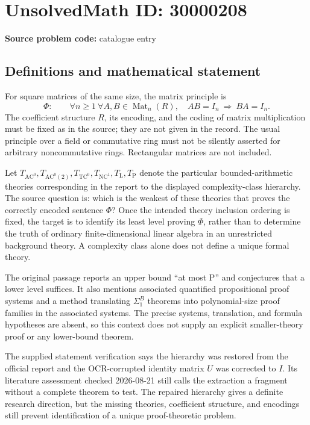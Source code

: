 \documentclass[11pt]{article}
\begin{document}
\section*{UnsolvedMath ID: 30000208}
\textbf{Source problem code:} catalogue entry
\subsection{Definitions and mathematical statement}
For square matrices of the same size, the matrix principle is
\[
\Phi:\qquad\forall n\geq1\ \forall A,B\in\operatorname{Mat}_n(R),\quad
AB=I_n\ \Longrightarrow\ BA=I_n.
\]
The coefficient structure \(R\), its encoding, and the coding of matrix multiplication must be fixed as in the source; they are not given in the record. The usual principle over a field or commutative ring must not be silently asserted for arbitrary noncommutative rings. Rectangular matrices are not included.

Let \(T_{\mathrm{AC}^0},T_{\mathrm{AC}^0(2)},T_{\mathrm{TC}^0},T_{\mathrm{NC}^1},T_{\mathrm L},T_{\mathrm P}\) denote the particular bounded-arithmetic theories corresponding in the report to the displayed complexity-class hierarchy. The source question is: which is the weakest of these theories that proves the correctly encoded sentence \(\Phi\)? Once the intended theory inclusion ordering is fixed, the target is to identify its least level proving \(\Phi\), rather than to determine the truth of ordinary finite-dimensional linear algebra in an unrestricted background theory. A complexity class alone does not define a unique formal theory.

The original passage reports an upper bound ``at most \(\mathrm P\)'' and conjectures that a lower level suffices. It also mentions associated quantified propositional proof systems and a method translating \(\Sigma^B_1\) theorems into polynomial-size proof families in the associated systems. The precise systems, translation, and formula hypotheses are absent, so this context does not supply an explicit smaller-theory proof or any lower-bound theorem.

The supplied statement verification says the hierarchy was restored from the official report and the OCR-corrupted identity matrix \(U\) was corrected to \(I\). Its literature assessment checked 2026-08-21 still calls the extraction a fragment without a complete theorem to test. The repaired hierarchy gives a definite research direction, but the missing theories, coefficient structure, and encodings still prevent identification of a unique proof-theoretic problem.
\end{document}
